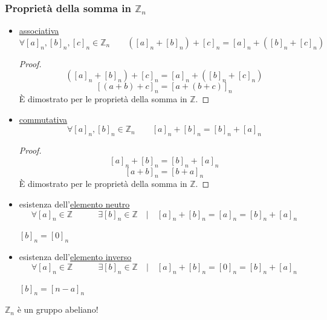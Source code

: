\documentclass[a4paper,12pt, oneside]{book}
\begin{document}
\subsubsection{Proprietà della somma in $\mathbb{Z}_n$}
\begin{itemize}
	\item \underline{associativa}
	      $$\forall [a]_n, [b]_n, [c]_n \in \mathbb{Z}_n \qquad ([a]_n+[b]_n)+[c]_n = [a]_n+([b]_n+[c]_n)$$
	      \begin{proof}
		      $$([a]_n+[b]_n)+[c]_n = [a]_n+([b]_n+[c]_n)$$
		      $$[(a+b)+c]_n = [a+(b+c)]_n$$
		      È dimostrato per le proprietà della somma in $\mathbb{Z}$.
	      \end{proof}
	\item \underline{commutativa}
	      $$\forall [a]_n, [b]_n \in \mathbb{Z}_n \qquad [a]_n+[b]_n = [b]_n+[a]_n$$
	      \begin{proof}
		      $$[a]_n+[b]_n = [b]_n+[a]_n$$
		      $$[a+b]_n = [b+a]_n$$
		      È dimostrato per le proprietà della somma in $\mathbb{Z}$.
	      \end{proof}
	\item esistenza dell'\underline{elemento neutro}
	      $$\forall [a]_n \in \mathbb{Z} \qquad\quad \exists [b]_n \in \mathbb{Z} \quad | \quad [a]_n+[b]_n=[a]_n=[b]_n+[a]_n$$
	      \begin{nota}
		      $[b]_n = [0]_n$
	      \end{nota}
	\item esistenza dell'\underline{elemento inverso}
	      $$\forall [a]_n \in \mathbb{Z} \qquad\quad \exists [b]_n \in \mathbb{Z} \quad | \quad [a]_n+[b]_n=[0]_n=[b]_n+[a]_n$$
	      \begin{nota}
		      $[b]_n = [n-a]_n$
	      \end{nota}
\end{itemize}
\begin{nota}
	$\mathbb{Z}_n$ è un gruppo abeliano!
\end{nota}
\end{document}
